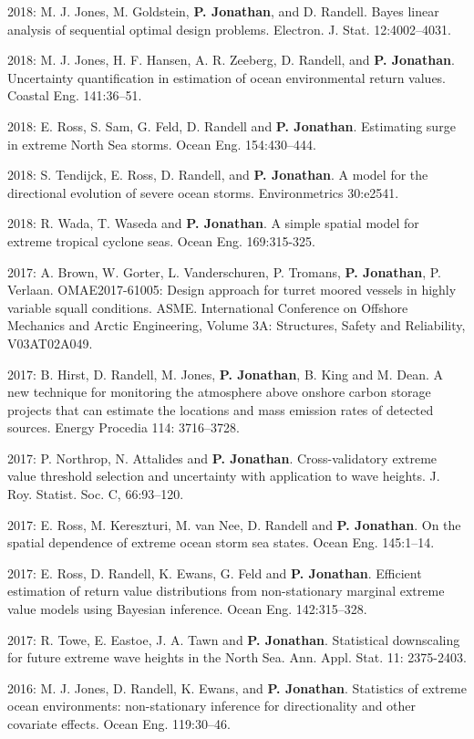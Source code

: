 \documentclass[11pt,a4paper]{moderncv}
\begin{document}
2018: M. J. Jones, M. Goldstein, \textbf{P. Jonathan}, and D. Randell. Bayes linear analysis of sequential optimal design problems. Electron. J. Stat. 12:4002--4031.

2018: M. J. Jones, H. F. Hansen, A. R. Zeeberg, D. Randell, and \textbf{P. Jonathan}. Uncertainty quantification in estimation of ocean environmental return values. Coastal Eng. 141:36--51.

2018: E. Ross, S. Sam, G. Feld, D. Randell and \textbf{P. Jonathan}. Estimating surge in extreme North Sea storms. Ocean Eng. 154:430--444.

2018: S. Tendijck, E. Ross, D. Randell, and \textbf{P. Jonathan}. A model for the directional evolution of severe ocean storms. Environmetrics 30:e2541.

2018: R. Wada, T. Waseda and \textbf{P. Jonathan}. A simple spatial model for extreme tropical cyclone seas.  Ocean Eng. 169:315-325.

2017: A. Brown, W. Gorter, L. Vanderschuren, P. Tromans, \textbf{P. Jonathan}, P. Verlaan. OMAE2017-61005: Design approach for turret moored vessels in highly variable squall conditions. ASME. International Conference on Offshore Mechanics and Arctic Engineering, Volume 3A: Structures, Safety and Reliability, V03AT02A049.

2017: B. Hirst, D. Randell, M. Jones, \textbf{P. Jonathan}, B. King and M. Dean. A new technique for monitoring the atmosphere above onshore carbon storage projects that can estimate the locations and mass emission rates of detected sources.  Energy Procedia 114: 3716--3728.

2017: P. Northrop, N. Attalides and \textbf{P. Jonathan}. Cross-validatory extreme value threshold selection and uncertainty with application to wave heights. J. Roy. Statist. Soc. C, 66:93--120.

2017: E. Ross, M. Kereszturi, M. van Nee, D. Randell and \textbf{P. Jonathan}. On the spatial dependence of extreme ocean storm sea states. Ocean Eng. 145:1--14.

2017: E. Ross, D. Randell, K. Ewans, G. Feld and \textbf{P. Jonathan}. Efficient estimation of return value distributions from non-stationary marginal extreme value models using Bayesian inference. Ocean Eng. 142:315--328.

2017: R. Towe, E. Eastoe, J. A. Tawn and \textbf{P. Jonathan}. Statistical downscaling for future extreme wave heights in the North Sea. Ann. Appl. Stat. 11: 2375-2403.

2016: M. J. Jones, D. Randell, K. Ewans, and \textbf{P. Jonathan}. Statistics of extreme ocean environments: non-stationary inference for directionality and other covariate effects. Ocean Eng. 119:30--46.
\end{document}
